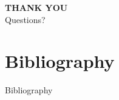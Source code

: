 \documentclass[hyperref={pdfpagelabels=false}]{beamer}
\begin{document}
     
     \begin{frame}
       \begin{center}
         \Large \textbf{THANK YOU}\\[20pt]
         
       Questions?
       \end{center}
     \end{frame}
       

     \appendix
     \section{Bibliography}

     \begin{frame}[c] %
       \begin{center}
         \LARGE Bibliography
       \end{center}
     \end{frame}

     
     \begin{frame}[allowframebreaks]
       
       \tiny \printbibliography
     \end{frame}
\end{document}
